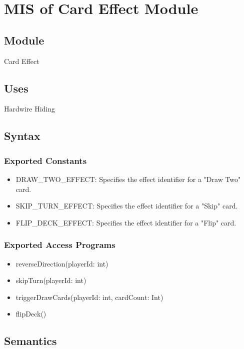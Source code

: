\documentclass[12pt, titlepage]{article}
\begin{document}
\section{MIS of Card Effect Module} 
\label{CEM}

\subsection{Module}
\hspace{1.5em}Card Effect

\subsection{Uses}
\hspace{1.5em}Hardwire Hiding

\subsection{Syntax}

\subsubsection{Exported Constants}
\begin{itemize}
\item DRAW\_TWO\_EFFECT: Specifies the effect identifier for a "Draw Two" card.
\item SKIP\_TURN\_EFFECT: Specifies the effect identifier for a "Skip" card.
\item FLIP\_DECK\_EFFECT: Specifies the effect identifier for a "Flip" card.
\end{itemize}

\subsubsection{Exported Access Programs}

\begin{itemize}
\item reverseDirection(playerId: int)
\item skipTurn(playerId: int)
\item triggerDrawCards(playerId: int, cardCount: Int)
\item flipDeck()
\end{itemize}

\subsection{Semantics}
\end{document}
